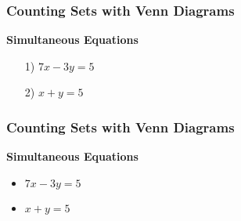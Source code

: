 \documentclass{beamer}
\begin{document}
\begin{frame}
\frametitle{Counting Sets with Venn Diagrams}
\Large
\vspace{-2.8cm}
\textbf{Simultaneous Equations}
\begin{itemize}
\item[1)] $7x-3y=5$
\item[2)] $x+y=5$
\end{itemize}
\end{frame}

\begin{frame}
\frametitle{Counting Sets with Venn Diagrams}
\Large
\vspace{-2.8cm}
\textbf{Simultaneous Equations}
\begin{itemize}
\item $7x-3y=5$
\item $x+y=5$
\end{itemize}
\end{frame}
\end{document}
